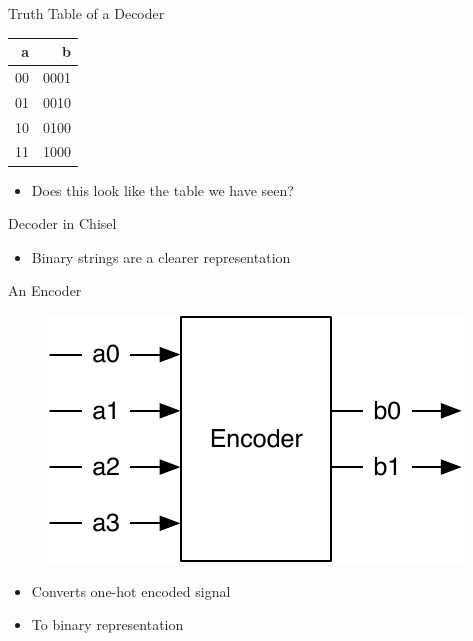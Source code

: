 \documentclass[xcolor=pdflatex,dvipsnames,table]{beamer}
\newcommand{\scale}{0.7}
\begin{document}
\begin{frame}[fragile]{Truth Table of a Decoder}
\begin{table}
  \begin{tabular}{rr}
    \toprule
    a & b \\
    \midrule
    00 & 0001 \\
    01 & 0010 \\
    10 & 0100 \\
    11 & 1000 \\
    \bottomrule 
  \end{tabular} 
\end{table}
\begin{itemize}
\item Does this look like the table we have seen?
\end{itemize}
\end{frame}

\begin{frame}[fragile]{Decoder in Chisel}
\begin{itemize}
\item Binary strings are a clearer representation
\end{itemize}
\end{frame}

\begin{frame}[fragile]{An Encoder}
\begin{figure}
  \includegraphics[scale=\scale]{../figures/encoder}
\end{figure}
\begin{itemize}
\item Converts one-hot encoded signal
\item To binary representation
\end{itemize}
\end{frame}
\end{document}
